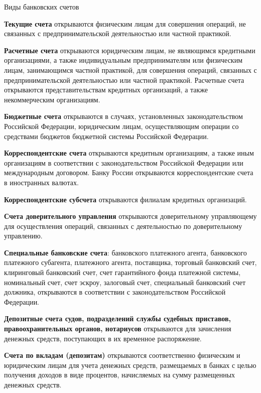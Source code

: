 \documentclass[_Banking_p2.tex]{subfiles}
\begin{document}
\begin{frame}[allowframebreaks]{Виды банковских счетов}

\textbf{Текущие счета }открываются физическим лицам для совершения операций, не связанных с предпринимательской деятельностью или частной практикой.

\textbf{Расчетные счета} открываются юридическим лицам, не являющимся кредитными организациями, а также индивидуальным предпринимателям или физическим лицам, занимающимся частной практикой, для совершения операций, связанных с предпринимательской деятельностью или частной практикой. Расчетные счета открываются представительствам кредитных организаций, а также некоммерческим организациям.

\pagebreak
\textbf{Бюджетные счета }открываются в случаях, установленных законодательством Российской Федерации, юридическим лицам, осуществляющим операции со средствами бюджетов бюджетной системы Российской Федерации.

\textbf{Корреспондентские счета }открываются кредитным организациям, а также иным организациям в соответствии с законодательством Российской Федерации или международным договором. Банку России открываются корреспондентские счета в иностранных валютах.

\textbf{Корреспондентские субсчета} открываются филиалам кредитных организаций.

\pagebreak
\textbf{Счета доверительного управления} открываются доверительному управляющему для осуществления операций, связанных с деятельностью по доверительному управлению.

\textbf{Специальные банковские счета}: банковского платежного агента, банковского платежного субагента, платежного агента, поставщика, торговый банковский счет, клиринговый банковский счет, счет гарантийного фонда платежной системы, номинальный счет, счет эскроу, залоговый счет, специальный банковский счет должника, открываются в соответствии с законодательством Российской Федерации.

\pagebreak
\textbf{Депозитные счета судов, подразделений службы судебных приставов, правоохранительных органов, нотариусов} открываются для зачисления денежных средств, поступающих в их временное распоряжение.

\textbf{Счета по вкладам (депозитам)} открываются соответственно физическим и юридическим лицам для учета денежных средств, размещаемых в банках с целью получения доходов в виде процентов, начисляемых на сумму размещенных денежных средств.
\end{frame}
\end{document}

